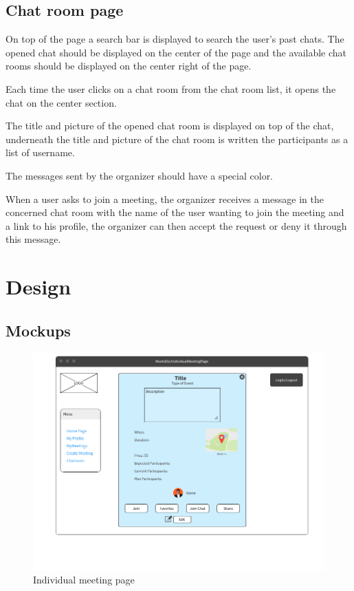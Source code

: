 \documentclass[conference]{IEEEtran}
\begin{document}
\subsection{Chat room page}

On top of the page a search bar is displayed to search the user's past chats.
The opened chat should be displayed on the center of the page and the available chat rooms should be displayed on the center right of the page.

Each time the user clicks on a chat room from the chat room list, it opens the chat on the center section.

The title and picture of the opened chat room is displayed on top of the chat, underneath the title and picture of the chat room is written the participants as a list of username.

The messages sent by the organizer should have a special color.

When a user asks to join a meeting, the organizer receives a message in the concerned chat room with the name of the user wanting to join the meeting and a link to his profile, the organizer can then accept the request or deny it through this message.


\section{Design}

\subsection{Mockups}

\begin{figure}
  \centering
  \includegraphics[scale=0.3]{mockups/IndivMeeting}\quad
  \caption { Individual meeting page}
\end{figure}
\end{document}
